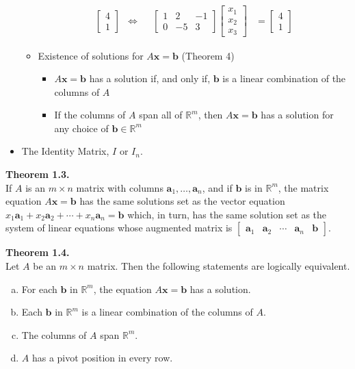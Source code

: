 \documentclass[10pt]{book}
\newenvironment{boxthm}{\begin{mdframed}[backgroundcolor=gray!30,nobreak=true]}{\end{mdframed}}
\newcommand{\R}{\mathbb{R}}
\newcommand{\vect}[1]{\ensuremath{\boldsymbol{\mathbf{#1}}}}
\begin{document}
\begin{itemize}
\begin{itemize}
\begin{align*}
			\begin{bmatrix}4\\1\end{bmatrix}
			&\Longleftrightarrow&&
			\begin{bmatrix}1&2&-1\\0&-5&3\end{bmatrix}
			\begin{bmatrix}x_1\\x_2\\x_3\end{bmatrix} &=
			\begin{bmatrix}4\\1\end{bmatrix}
			\end{align*}
			\item Existence of solutions for $A\vect{x}=\vect{b}$ (Theorem 4)
				\begin{itemize}
					\item $A\vect{x}=\vect{b}$ has a solution if, and only if, $\vect{b}$ is a linear combination of the columns of $A$
					\item If the columns of $A$ span all of $\R^m$, then $A\vect{x}=\vect{b}$ has a solution for any choice of $\vect{b}\in\R^m$
				\end{itemize}
		\end{itemize}
	\item The Identity Matrix, $I$ or $I_n$.
\end{itemize}
\begin{boxthm}
	\textbf{Theorem 1.3.} \\
	If $A$ is an $m\times n$ matrix with columns $\vect{a}_1,\ldots,\vect{a}_n$, and if $\vect{b}$ is in $\R^m$, the matrix equation $A\vect{x}=\vect{b}$ has the same solutions set as the vector equation $x_1\vect{a}_1+x_2\vect{a}_2+\cdots+x_n\vect{a}_n=\vect{b}$ which, in turn, has the same solution set as the system of linear equations whose augmented matrix is $\begin{bmatrix}\vect{a}_1&\vect{a}_2&\cdots&\vect{a}_n&\vect{b}\end{bmatrix}$.
\end{boxthm}
\begin{boxthm}
	\textbf{Theorem 1.4.} \\
	Let $A$ be an $m\times n$ matrix. Then the following statements are logically equivalent.
	\begin{enumerate}[(a)]\itemsep0em 
		\item For each $\vect{b}$ in $\R^m$, the equation $A\vect{x}=\vect{b}$ has a solution.
		\item Each $\vect{b}$ in $\R^m$ is a linear combination of the columns of $A$.
		\item The columns of $A$ span $\R^m$.
		\item $A$ has a pivot position in every row.
	\end{enumerate}
\end{boxthm}
\end{document}
